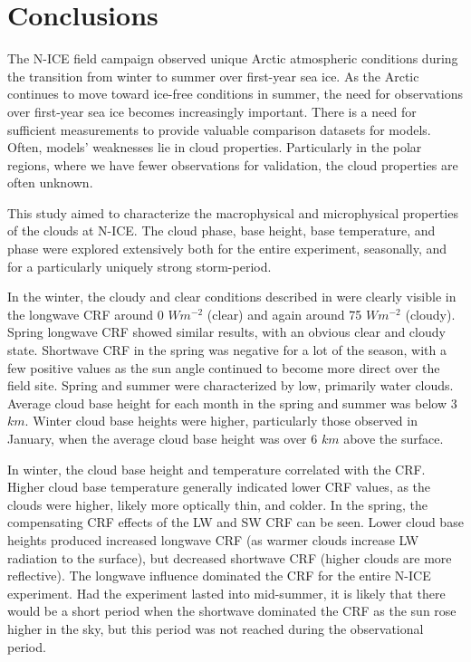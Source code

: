 \section{Conclusions}
The N-ICE field campaign observed unique Arctic atmospheric conditions during the transition from winter to summer over first-year sea ice. As the Arctic continues to move toward ice-free conditions in summer, the need for observations over first-year sea ice becomes increasingly important. There is a need for sufficient measurements to provide valuable comparison datasets for models. Often, models' weaknesses lie in cloud properties. Particularly in the polar regions, where we have fewer observations for validation, the cloud properties are often unknown.

This study aimed to characterize the macrophysical and microphysical properties of the clouds at N-ICE. The cloud phase, base height, base temperature, and phase were explored extensively both for the entire experiment, seasonally, and for a particularly uniquely strong storm-period. 

In the winter, the cloudy and clear conditions described in \citet{graham:2017} were clearly visible in the longwave CRF around 0 $Wm^{-2}$ (clear) and again around 75 $Wm^{-2}$ (cloudy). Spring longwave CRF showed similar results, with an obvious clear and cloudy state. Shortwave CRF in the spring was negative for a lot of the season, with a few positive values as the sun angle continued to become more direct over the field site. Spring and summer were characterized by low, primarily water clouds. Average cloud base height for each month in the spring and summer was below 3 $km$. Winter cloud base heights were higher, particularly those observed in January, when the average cloud base height was over 6 $km$ above the surface.

In winter, the cloud base height and temperature correlated with the CRF. Higher cloud base temperature generally indicated lower CRF values, as the clouds were higher, likely more optically thin, and colder. In the spring, the compensating CRF effects of the LW and SW CRF can be seen. Lower cloud base heights produced increased longwave CRF (as warmer clouds increase LW radiation to the surface), but decreased shortwave CRF (higher clouds are more reflective). The longwave influence dominated the CRF for the entire N-ICE experiment. Had the experiment lasted into mid-summer, it is likely that there would be a short period when the shortwave dominated the CRF as the sun rose higher in the sky, but this period was not reached during the observational period.

